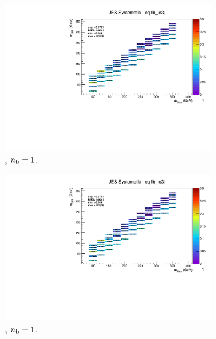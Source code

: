 \begin{figure}[ht!]
\begin{subfigure}[b]{0.32\textwidth}
    \includegraphics[width=\textwidth, page=8]{Figs/sms/t2cc/v37_2/systs/T2cc_JES_eq1b_le3j.pdf}
    \caption{\njlow, $n_{\text{b}} = 1$.}
  \end{subfigure}
  \begin{subfigure}[b]{0.32\textwidth}
    \includegraphics[width=\textwidth, page=1]{Figs/sms/t2cc/v37_2/systs/T2cc_JES_eq1b_le3j.pdf}
    \caption{\njlow, $n_{\text{b}} = 1$.}
    \label{fig:sms-jes-t2cc-le3j-1b}
  \end{subfigure}\\
  \begin{subfigure}[b]{0.32\textwidth}

\end{subfigure}
\end{figure}

